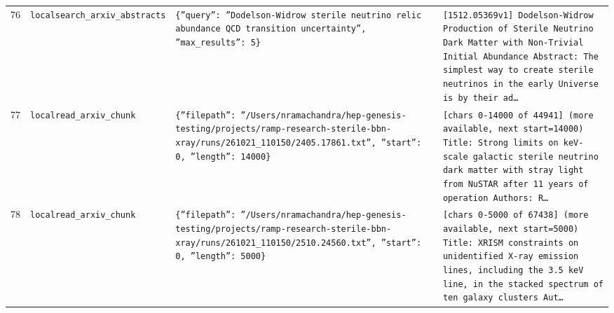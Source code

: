 \documentclass[11pt,a4paper]{article}
\begin{document}
\begin{longtable}{@{}p{}p{}p{}p{}@{}}
76 & \texttt{local}\newline\texttt{search\_\allowbreak{}arxiv\_\allowbreak{}abstracts} & \texttt{\{''query'':\allowbreak{} ''Dodelson-Widrow sterile neutrino relic abundance QCD transition uncertainty'',\allowbreak{} ''max\_\allowbreak{}results'':\allowbreak{} 5\}\allowbreak{}} & \texttt{[1512.05369v1]\allowbreak{} Dodelson-Widrow Production of Sterile Neutrino Dark Matter with Non-Trivial Initial Abundance Abstract:\allowbreak{} The simplest way to create sterile neutrinos in the early Universe is by their ad\ldots{}\allowbreak{}} \\
77 & \texttt{local}\newline\texttt{read\_\allowbreak{}arxiv\_\allowbreak{}chunk} & \texttt{\{''filepath'':\allowbreak{} ''/\allowbreak{}Users/\allowbreak{}nramachandra/\allowbreak{}hep-genesis-testing/\allowbreak{}projects/\allowbreak{}ramp-research-sterile-bbn-xray/\allowbreak{}runs/\allowbreak{}261021\_\allowbreak{}110150/\allowbreak{}2405.17861.txt'',\allowbreak{} ''start'':\allowbreak{} 0,\allowbreak{} ''length'':\allowbreak{} 14000\}\allowbreak{}} & \texttt{[chars 0-14000 of 44941]\allowbreak{} (more available,\allowbreak{} next start=\allowbreak{}14000)\allowbreak{}  Title:\allowbreak{} Strong limits on keV-scale galactic sterile neutrino dark matter with stray light from NuSTAR after 11 years of operation Authors:\allowbreak{} R\ldots{}\allowbreak{}} \\
78 & \texttt{local}\newline\texttt{read\_\allowbreak{}arxiv\_\allowbreak{}chunk} & \texttt{\{''filepath'':\allowbreak{} ''/\allowbreak{}Users/\allowbreak{}nramachandra/\allowbreak{}hep-genesis-testing/\allowbreak{}projects/\allowbreak{}ramp-research-sterile-bbn-xray/\allowbreak{}runs/\allowbreak{}261021\_\allowbreak{}110150/\allowbreak{}2510.24560.txt'',\allowbreak{} ''start'':\allowbreak{} 0,\allowbreak{} ''length'':\allowbreak{} 5000\}\allowbreak{}} & \texttt{[chars 0-5000 of 67438]\allowbreak{} (more available,\allowbreak{} next start=\allowbreak{}5000)\allowbreak{}  Title:\allowbreak{} XRISM constraints on unidentified X-ray emission lines,\allowbreak{} including the 3.5 keV line,\allowbreak{} in the stacked spectrum of ten galaxy clusters Aut\ldots{}\allowbreak{}} \\

\end{longtable}
\end{document}
